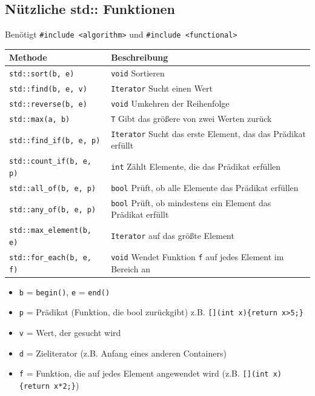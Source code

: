 \documentclass[9pt, a3paper, landscape]{article}
\begin{document}
\begin{multicols*}{4}
 \section{Nützliche std:: Funktionen}
 Benötigt \lstinline|#include <algorithm>| und \lstinline|#include <functional>|
 \newline 
 \newline 
 \noindent
 \begin{tabularx}{\linewidth}{l >{\RaggedRight}X}
 \toprule
 \textbf{Methode} & \textbf{Beschreibung} \\
 \midrule
 \lstinline|std::sort(b, e)| & \lstinline|void|  Sortieren\\
 \lstinline|std::find(b, e, v)| & \lstinline|Iterator|  Sucht einen Wert \\
 \lstinline|std::reverse(b, e)| & \lstinline|void|  Umkehren der Reihenfolge \\
 \lstinline|std::max(a, b)| & \lstinline|T|  Gibt das größere von zwei Werten zurück \\
 \lstinline|std::find_if(b, e, p)| & \lstinline|Iterator|  Sucht das erste Element, das das Prädikat erfüllt \\
 \lstinline|std::count_if(b, e, p)| & \lstinline|int|  Zählt Elemente, die das Prädikat erfüllen \\
 \lstinline|std::all_of(b, e, p)| & \lstinline|bool|  Prüft, ob alle Elemente das Prädikat erfüllen \\
 \lstinline|std::any_of(b, e, p)| & \lstinline|bool|  Prüft, ob mindestens ein Element das Prädikat erfüllt \\
 \lstinline|std::max_element(b, e)| & \lstinline|Iterator|  auf das größte Element\\
 \lstinline|std::for_each(b, e, f)| & \lstinline|void|  Wendet Funktion \lstinline|f| auf jedes Element im Bereich an \\

 \bottomrule
 \end{tabularx}

 \begin{itemize}
     \item \lstinline|b| = \lstinline|begin()|, \lstinline|e| = \lstinline|end()|
     \item \lstinline|p| = Prädikat (Funktion, die bool zurückgibt) z.B. \lstinline|[](int x){return x>5;}|
     \item \lstinline|v| = Wert, der gesucht wird
     \item \lstinline|d| = Zieliterator (z.B. Anfang eines anderen Containers)
     \item \lstinline|f| = Funktion, die auf jedes Element angewendet wird (z.B. \lstinline|[](int x){return x*2;}|)
 \end{itemize}


\end{multicols*}
\end{document}

